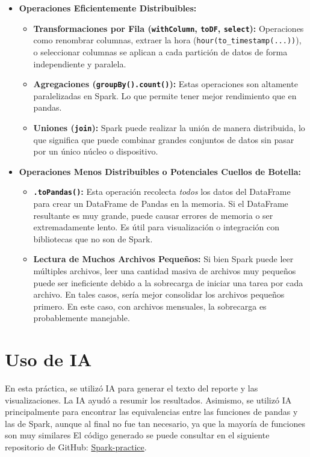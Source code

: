 \documentclass[12pt]{article}
\begin{document}
    \begin{itemize}
        \item \textbf{Operaciones Eficientemente Distribuibles:}
            \begin{itemize}
                \item \textbf{Transformaciones por Fila (\texttt{withColumn}, \texttt{toDF}, \texttt{select}):} Operaciones como renombrar columnas, extraer la hora (\texttt{hour(to\_timestamp(...))}), o seleccionar columnas se aplican a cada partición de datos de forma independiente y paralela.
                \item \textbf{Agregaciones (\texttt{groupBy().count()}):} Estas operaciones son altamente paralelizadas en Spark. Lo que permite tener mejor rendimiento que en pandas.
                \item \textbf{Uniones (\texttt{join}):} Spark puede realizar la unión de manera distribuida, lo que significa que puede combinar grandes conjuntos de datos sin pasar por un único núcleo o dispositivo.
            \end{itemize}
        \item \textbf{Operaciones Menos Distribuibles o Potenciales Cuellos de Botella:}
            \begin{itemize}
                \item \textbf{\texttt{.toPandas()}:} Esta operación recolecta \textit{todos} los datos del DataFrame  para crear un DataFrame de Pandas en la memoria. Si el DataFrame resultante es muy grande, puede causar errores de memoria o ser extremadamente lento. Es útil para visualización o integración con bibliotecas que no son de Spark.
                \item \textbf{Lectura de Muchos Archivos Pequeños:} Si bien Spark puede leer múltiples archivos, leer una cantidad masiva de archivos muy pequeños puede ser ineficiente debido a la sobrecarga de iniciar una tarea por cada archivo. En tales casos, sería mejor consolidar los archivos pequeños primero. En este caso, con archivos mensuales, la sobrecarga es probablemente manejable.
            \end{itemize}
    \end{itemize}
\section{Uso de IA}
    En esta práctica, se utilizó IA para generar el texto del reporte y las visualizaciones. La IA ayudó a resumir los resultados.
    Asimismo, se utilizó IA principalmente para encontrar las equivalencias entre las funciones de pandas y las de Spark, aunque al final no fue tan necesario, ya que la mayoría de funciones son muy similares
    El código generado se puede consultar en el siguiente repositorio de GitHub: \href{https://github.com/Jorge95Cortes/Spark-practice.git}{Spark-practice}.
\end{document}
